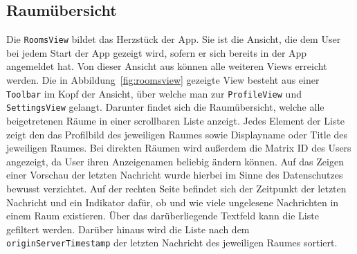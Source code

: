     \newpage
    \subsection{Raumübersicht}\label{subsec:raumubersicht}

    Die \texttt{RoomsView} bildet das Herzstück der App.
    Sie ist die Ansicht, die dem User bei jedem Start der App gezeigt wird, sofern er sich bereits in der App angemeldet hat.
    Von dieser Ansicht aus können alle weiteren Views erreicht werden.
    Die in Abbildung~\ref{fig:roomsview} gezeigte View besteht aus einer \texttt{Toolbar} im Kopf der Ansicht, über welche man zur \texttt{ProfileView} und \texttt{SettingsView} gelangt.
    Darunter findet sich die Raumübersicht, welche alle beigetretenen Räume in einer scrollbaren Liste anzeigt.
    Jedes Element der Liste zeigt den das Profilbild des jeweiligen Raumes sowie Displayname oder Title des jeweiligen Raumes.
    Bei direkten Räumen wird außerdem die Matrix ID des Users angezeigt, da User ihren Anzeigenamen beliebig ändern können.
    Auf das Zeigen einer Vorschau der letzten Nachricht wurde hierbei im Sinne des Datenschutzes bewusst verzichtet.
    Auf der rechten Seite befindet sich der Zeitpunkt der letzten Nachricht und ein Indikator dafür, ob und wie viele ungelesene Nachrichten in einem Raum existieren.
    Über das darüberliegende Textfeld kann die Liste gefiltert werden.
    Darüber hinaus wird die Liste nach dem  \texttt{originServerTimestamp} der letzten Nachricht des jeweiligen Raumes sortiert.

